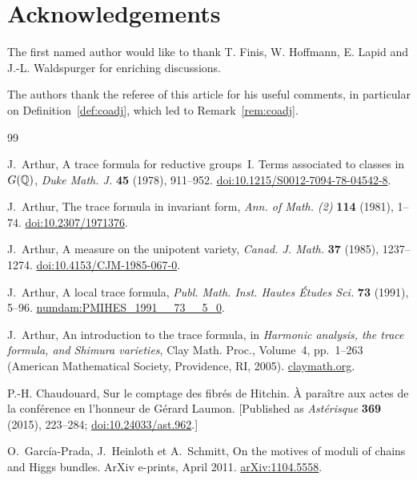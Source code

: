 \section*{Acknowledgements}

The first named author would like to thank T. Finis, W. Hoffmann, E. Lapid and J.-L. Waldspurger for enriching discussions.

The authors thank the referee of this article for his useful comments, in particular on Definition~\ref{def:coadj}, which led to Remark~\ref{rem:coadj}.

\begin{thebibliography}{99}

J.~Arthur, A trace formula for reductive groups~I. Terms associated to classes in $G(\mathbb{Q})$, \emph{Duke Math. J.} \textbf{45} (1978), 911--952.
\href{https://doi.org/10.1215/S0012-7094-78-04542-8}{doi:10.1215/S0012-7094-78-04542-8}.

J.~Arthur, The trace formula in invariant form, \emph{Ann. of Math. (2)} \textbf{114} (1981), 1--74.
\href{https://doi.org/10.2307/1971376}{doi:10.2307/1971376}.

J.~Arthur, A measure on the unipotent variety, \emph{Canad. J. Math.} \textbf{37} (1985), 1237--1274.
\href{https://doi.org/10.4153/CJM-1985-067-0}{doi:10.4153/CJM-1985-067-0}.

J.~Arthur, A local trace formula, \emph{Publ. Math. Inst. Hautes \'{E}tudes Sci.} \textbf{73} (1991), 5--96.
\href{http://www.numdam.org/item/PMIHES_1991__73__5_0/}{numdam:PMIHES\_1991\_\_73\_\_5\_0}.

J.~Arthur, An introduction to the trace formula, in \emph{Harmonic analysis, the trace formula, and Shimura varieties}, Clay Math. Proc., Volume~4, pp.~1--263 (American Mathematical Society, Providence, RI, 2005).
\href{https://www.claymath.org/library/cw/arthur/pdf/62.pdf}{claymath.org}.

P.-H. Chaudouard, Sur le comptage des fibr\'{e}s de Hitchin. \`{A} para\^{i}tre aux actes de la conf\'{e}rence en l'honneur de G\'{e}rard Laumon.
[Published as \emph{Ast\'{e}risque} \textbf{369} (2015), 223--284;
\href{https://doi.org/10.24033/ast.962}{doi:10.24033/ast.962}.]

O.~Garc\'{i}a-Prada, J.~Heinloth et A.~Schmitt, On the motives of moduli of chains and Higgs bundles. ArXiv e-prints, April 2011.
\href{https://arxiv.org/abs/1104.5558}{arXiv:1104.5558}.


\end{thebibliography}
